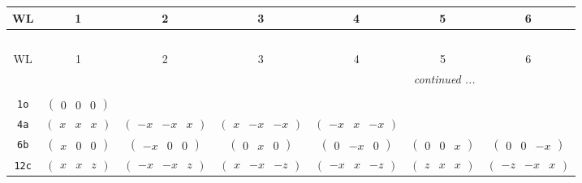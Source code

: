 \documentclass[fleqn,9pt,landscape]{jsarticle}
\begin{document}
\begin{center}
\renewcommand{\arraystretch}{1.2}
\begin{longtable}{ccccccc}
 \hline \hline
WL & 1 & 2 & 3 & 4 & 5 & 6 \\ \hline \endfirsthead

\multicolumn{6}{l}{\tablename\ \thetable{}} \\
 \hline \hline
WL & 1 & 2 & 3 & 4 & 5 & 6 \\ \hline \endhead

 \hline \hline
\multicolumn{6}{r}{\footnotesize\it continued ...} \\ \endfoot

 \hline \hline
\multicolumn{6}{r}{} \\ \endlastfoot

{\tt 1o} & $ \begin{pmatrix} 0 & 0 & 0 \end{pmatrix} $ & $  $ & $  $ & $  $ & $  $ & $  $ \\ \hline
{\tt 4a} & $ \begin{pmatrix} x & x & x \end{pmatrix} $ & $ \begin{pmatrix} - x & - x & x \end{pmatrix} $ & $ \begin{pmatrix} x & - x & - x \end{pmatrix} $ & $ \begin{pmatrix} - x & x & - x \end{pmatrix} $ & $  $ & $  $ \\ \hline
{\tt 6b} & $ \begin{pmatrix} x & 0 & 0 \end{pmatrix} $ & $ \begin{pmatrix} - x & 0 & 0 \end{pmatrix} $ & $ \begin{pmatrix} 0 & x & 0 \end{pmatrix} $ & $ \begin{pmatrix} 0 & - x & 0 \end{pmatrix} $ & $ \begin{pmatrix} 0 & 0 & x \end{pmatrix} $ & $ \begin{pmatrix} 0 & 0 & - x \end{pmatrix} $ \\ \hline
{\tt 12c} & $ \begin{pmatrix} x & x & z \end{pmatrix} $ & $ \begin{pmatrix} - x & - x & z \end{pmatrix} $ & $ \begin{pmatrix} x & - x & - z \end{pmatrix} $ & $ \begin{pmatrix} - x & x & - z \end{pmatrix} $ & $ \begin{pmatrix} z & x & x \end{pmatrix} $ & $ \begin{pmatrix} - z & - x & x \end{pmatrix} $ \\

\end{longtable}
\end{center}
\end{document}
